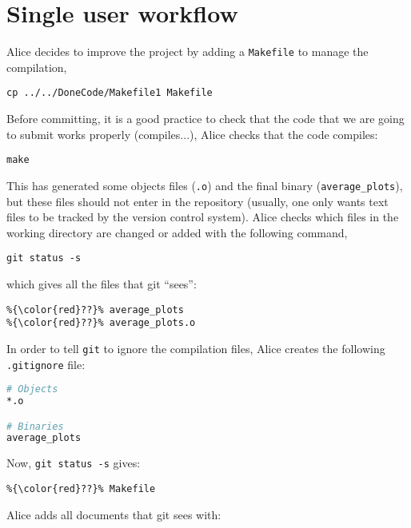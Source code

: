 \documentclass[a4paper,10pt]{article}
\begin{document}
\clearpage

\section{Single user workflow}
Alice decides to improve the project by adding a \texttt{Makefile} to manage the compilation,

\begin{lstlisting}[style=AliceFake]
 cp ../../DoneCode/Makefile1 Makefile
\end{lstlisting}

Before committing, it is a good practice to check that the code that we are going to submit works properly (compiles...), Alice checks that the code compiles:

\begin{lstlisting}[style=AliceFake]
 make
\end{lstlisting}

This has generated some objects files (\texttt{.o}) and the final binary (\texttt{average\_plots}), but these files should not enter in the repository (usually, one only wants text files to be tracked by the version control system). Alice checks which files in the working directory are changed or added with the following command,

\begin{lstlisting}[style=Alice]
 git status -s
\end{lstlisting}
which gives all the files that git ``sees'':

\begin{lstlisting}[style=Output]
%{\color{red}??}% Makefile
%{\color{red}??}% average_plots
%{\color{red}??}% average_plots.o
\end{lstlisting}

In order to tell \texttt{git} to ignore the compilation files, Alice creates the following \texttt{.gitignore} file:

\begin{lstlisting}[style=Text,language=bash,commentstyle=\color{blue}]
# Objects
*.o

# Binaries
average_plots
\end{lstlisting}

Now, \texttt{git status -s} gives:

\begin{lstlisting}[style=Output]
%{\color{red}??}% .gitignore
%{\color{red}??}% Makefile
\end{lstlisting}

Alice adds all documents that git sees with:
\end{document}

